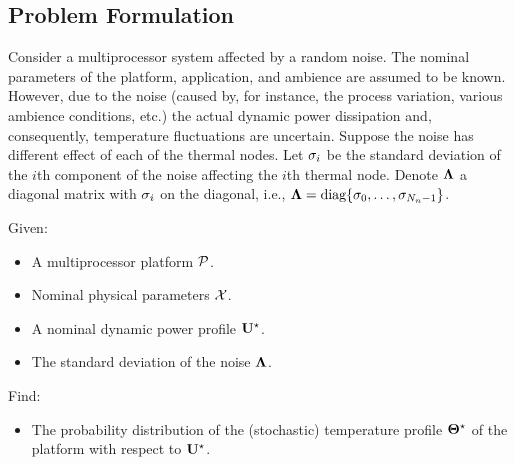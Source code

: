 \subsection{Problem Formulation}
Consider a multiprocessor system affected by a random noise. The nominal parameters of the platform, application, and ambience are assumed to be known. However, due to the noise (caused by, for instance, the process variation, various ambience conditions, etc.) the actual dynamic power dissipation and, consequently, temperature fluctuations are uncertain. Suppose the noise has different effect of each of the thermal nodes. Let $\sigma_i$ be the standard deviation of the $i$th component of the noise affecting the $i$th thermal node. Denote $\mathbf{\Lambda}$ a diagonal matrix with $\sigma_i$ on the diagonal, i.e., $\mathbf{\Lambda} = \text{diag}\{ \sigma_0, \dots, \sigma_{N_n - 1} \}$.

Given:
\begin{itemize}
  \item A multiprocessor platform $\mathcal{P}$.
  \item Nominal physical parameters $\mathcal{X}$.
  \item A nominal dynamic power profile $\mathbf{U}^\star$.
  \item The standard deviation of the noise $\mathbf{\Lambda}$.
\end{itemize}

Find:
\begin{itemize}
  \item The probability distribution of the (stochastic) temperature profile $\mathbf{\Theta}^\star$ of the platform with respect to $\mathbf{U}^\star$.
\end{itemize}

